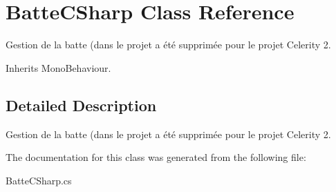 \hypertarget{class_batte_c_sharp}{\section{Batte\+C\+Sharp Class Reference}
\label{class_batte_c_sharp}
}


Gestion de la batte (dans le projet a été supprimée pour le projet Celerity 2.  




Inherits Mono\+Behaviour.



\subsection{Detailed Description}
Gestion de la batte (dans le projet a été supprimée pour le projet Celerity 2. 



The documentation for this class was generated from the following file\+:\begin{DoxyCompactItemize}
\item 
Batte\+C\+Sharp.\+cs\end{DoxyCompactItemize}
